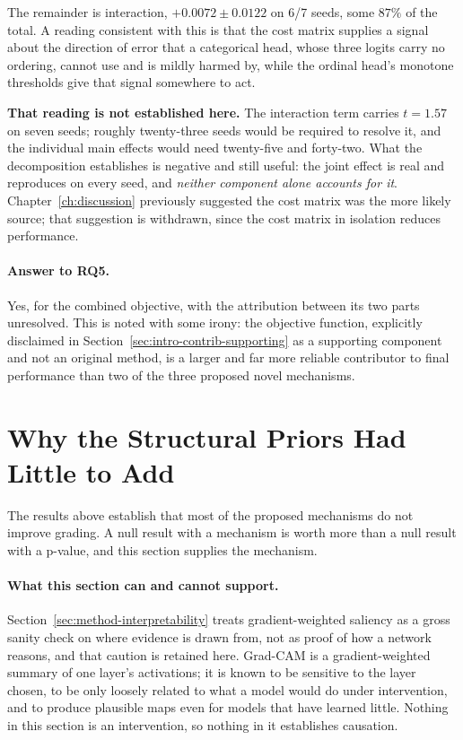 \documentclass[12pt,a4paper]{report}
\begin{document}
The remainder is interaction, $+0.0072 \pm 0.0122$ on 6/7 seeds, some $87\%$ of
the total. A reading consistent with this is that the cost matrix supplies a
signal about the direction of error that a categorical head, whose three logits
carry no ordering, cannot use and is mildly harmed by, while the ordinal head's
monotone thresholds give that signal somewhere to act.

\textbf{That reading is not established here.} The interaction term carries
$t = 1.57$ on seven seeds; roughly twenty-three seeds would be required to
resolve it, and the individual main effects would need twenty-five and
forty-two. What the decomposition establishes is negative and still useful: the
joint effect is real and reproduces on every seed, and \emph{neither component
alone accounts for it}. Chapter~\ref{ch:discussion} previously suggested the
cost matrix was the more likely source; that suggestion is withdrawn, since the
cost matrix in isolation reduces performance.

\paragraph{Answer to RQ5.} Yes, for the combined objective, with the
attribution between its two parts unresolved. This is noted with some irony: the
objective function, explicitly disclaimed in
Section~\ref{sec:intro-contrib-supporting} as a supporting component and not an
original method, is a larger and far more reliable contributor to final
performance than two of the three proposed novel mechanisms.

\section{Why the Structural Priors Had Little to Add}
\label{sec:results-attribution}

The results above establish that most of the proposed mechanisms do not improve
grading. A null result with a mechanism is worth more than a null result with a
p-value, and this section supplies the mechanism.

\paragraph{What this section can and cannot support.}
Section~\ref{sec:method-interpretability} treats gradient-weighted saliency as a
gross sanity check on where evidence is drawn from, not as proof of how a
network reasons, and that caution is retained here. Grad-CAM is a
gradient-weighted summary of one layer's activations; it is known to be
sensitive to the layer chosen, to be only loosely related to what a model would
do under intervention, and to produce plausible maps even for models that have
learned little. Nothing in this section is an intervention, so nothing in it
establishes causation.
\end{document}
